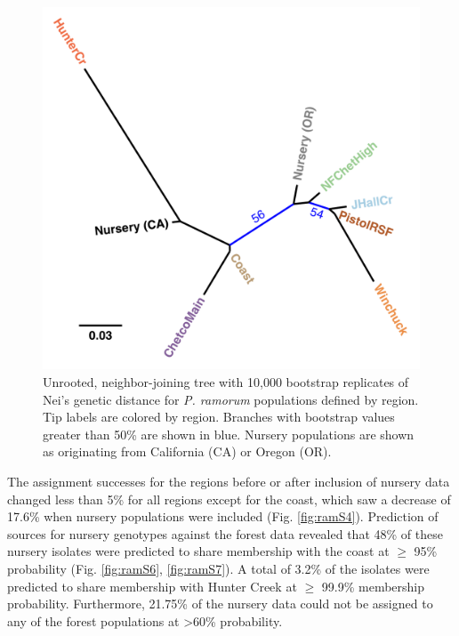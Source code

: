 \documentclass[double,11pt]{beavtex}
\begin{document}
  \begin{figure}
  
  {\centering \includegraphics[width=0.8\linewidth]{figure/phytopathology/figure_5} 
  
  }
  
  \caption[Unrooted, neighbor-joining tree with 10,000 bootstrap replicates of
  Nei's genetic distance for \emph{P. ramorum} populations defined by
  region.]{Unrooted, neighbor-joining tree with 10,000 bootstrap replicates of
  Nei's genetic distance for \emph{P. ramorum} populations defined by
  region. Tip labels are colored by region. Branches with bootstrap values
  greater than 50\% are shown in blue. Nursery populations are shown as
  originating from California (CA) or Oregon (OR).}\label{fig:ramorum5}
  \end{figure}
  
  \newpage
  
  The assignment successes for the regions before or after inclusion of
  nursery data changed less than 5\% for all regions except for the coast,
  which saw a decrease of 17.6\% when nursery populations were included
  (Fig. \ref{fig:ramS4}). Prediction of sources for nursery genotypes
  against the forest data revealed that 48\% of these nursery isolates
  were predicted to share membership with the coast at \(\geq\) 95\%
  probability (Fig. \ref{fig:ramS6}, \ref{fig:ramS7}). A total of 3.2\% of
  the isolates were predicted to share membership with Hunter Creek at
  \(\geq\) 99.9\% membership probability. Furthermore, 21.75\% of the
  nursery data could not be assigned to any of the forest populations at
  \textgreater{}60\% probability.
  
\end{document}
